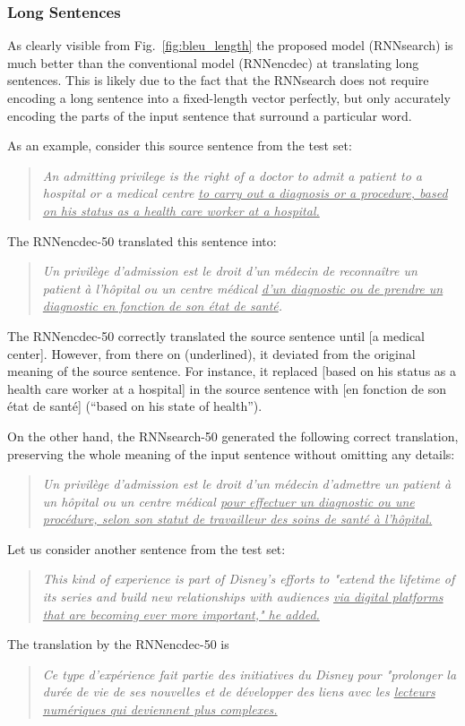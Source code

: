 \documentclass{article}
\begin{document}
\subsubsection{Long Sentences}

As clearly visible from Fig.~\ref{fig:bleu_length} the proposed model
(RNNsearch) is much better than the conventional model (RNNencdec) at translating
long sentences. This is likely due to the fact that the RNNsearch does not
require encoding a long sentence into a fixed-length vector perfectly, but only
accurately encoding the parts of the input sentence that surround a particular
word.

As an example, consider this source sentence from the test set:
\begin{quote}
    \it
An admitting privilege is the right of a doctor to admit a patient to a hospital
or a medical centre \uline{to carry out a diagnosis or a procedure, based on
his status as a health care worker at a hospital.}
\end{quote}
The RNNencdec-50 translated this sentence into:
\begin{quote}
    \it
Un privilège d'admission est le droit d'un m\'edecin de reconnaître un patient à
l'h\^opital ou un centre m\'edical \uline{d'un diagnostic ou de prendre un diagnostic
en fonction de son \'etat de sant\'e}.
\end{quote}

The RNNencdec-50 correctly translated the source sentence until [a medical center].
However, from there on (underlined), it deviated from the original meaning of
the source sentence. For instance, it replaced [based on his status as a health
care worker at a hospital] in the source sentence with [en fonction de son
\'etat de sant\'e] (``based on his state of health'').

On the other hand, the RNNsearch-50 generated the following correct translation,
preserving the whole meaning of the input sentence without omitting any details:
\begin{quote}
{    \it
Un privilège d'admission est le droit d'un m\'edecin d'admettre un patient à un
h\^opital ou un centre m\'edical \uline{pour effectuer un diagnostic ou une
proc\'edure, selon son statut de travailleur des soins de sant\'e à
l'h\^opital.}}
\end{quote}

Let us consider another sentence from the test set:
\begin{quote}
{    \it
This kind of experience is part of Disney's efforts to "extend the lifetime of
its series and build new relationships with audiences \uline{via digital platforms that
are becoming ever more important," he added.} }
\end{quote}
The translation by the RNNencdec-50 is
\begin{quote}
{    \it
Ce type d'exp\'erience fait partie des initiatives du Disney pour "prolonger la
dur\'ee de vie de ses nouvelles et de d\'evelopper des liens avec les
\uline{lecteurs num\'eriques qui deviennent plus complexes.} }
\end{quote}
\end{document}
